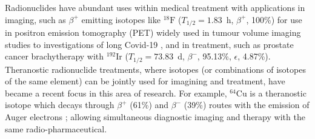\documentclass[../main.tex]{subfiles}
\begin{document}
Radionuclides have abundant uses within medical treatment with applications in imaging, such as $\beta^{+}$ emitting isotopes like $^{18}\mathrm{F}$ ($T_{1/2}=1.83$~\si{\hour}, $\beta^{+}$, 100\%) for use in positron emission tomography (PET) widely used in tumour volume imaging studies \cite{rocha2021metabolic} to investigations of long Covid-19 \cite{sollini2021long}, and in treatment, such as prostate cancer brachytherapy \cite{yuan2021proof} with $^{192}\textrm{Ir}$ ($T_{1/2} =73.83$~\si{\day}, $\beta^{-}$, 95.13\%, $\epsilon$, 4.87\%). Theranostic \cite{svenson2013theranostics} radionuclide treatments, where isotopes (or combinations of isotopes of the same element) can be jointly used for imagining and treatment, have became a recent focus in this area of research. For example, $^{64}\mathrm{Cu}$ is a theranostic isotope which decays through $\beta^{+}$ (61\%) and $\beta^{-}$ (39\%) routes with the emission of Auger electrons \cite{boschi2018emerging}; allowing simultaneous diagnostic imaging and therapy with the same radio-pharmaceutical.
\end{document}
